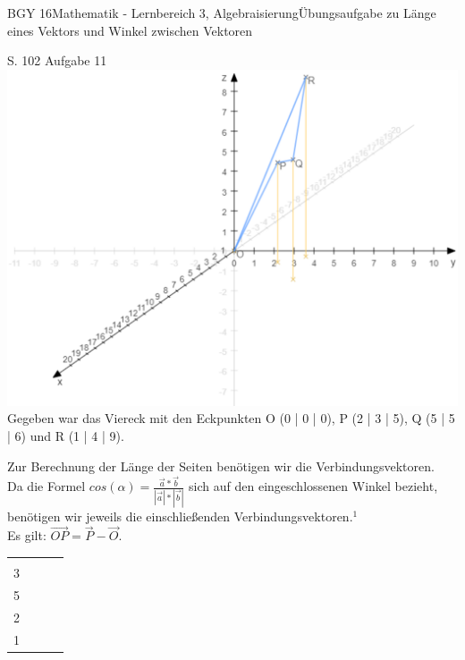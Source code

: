 \documentclass[oneside,openany,headings=optiontotoc,11pt,numbers=noenddot]{scrreprt}
\begin{document}
	\begin{worksheet}{BGY 16}{Mathematik - Lernbereich 3, Algebraisierung}{Übungsaufgabe zu Länge eines Vektors und Winkel zwischen Vektoren}
		
		\begin{framed}
			\noindent
			\tiny{\color{codegray}S. 102 Aufgabe 11}\\
			\normalsize
			\noindent
			\includegraphics[scale=0.7]{Bilder/S102N11.png}\\
			Gegeben war das Viereck mit den Eckpunkten O (0 | 0 | 0), P (2 | 3 | 5), Q (5 | 5 | 6) und R (1 | 4 | 9).\\
			\par\noindent
			Zur Berechnung der Länge der Seiten benötigen wir die Verbindungsvektoren.\\
			Da die Formel \(cos{(\alpha)} = \frac{\vec{a}*\vec{b}}{|\vec{a}|*|\vec{b}|}\) sich auf den eingeschlossenen Winkel bezieht, benötigen wir jeweils die einschließenden Verbindungsvektoren.\(^{1}\)\\
			\tiny{\color{codegray}Es gilt: \(\vec{OP} = \vec{P}-\vec{O}\).}\\
			\normalsize
			\par\noindent
			\begin{tabularx}{\textwidth}{XXXX}
				\(\vec{OP} = \left(\begin{array}{c}2 \\ 3 \\5\end{array}\right)\) &
				\(\vec{PQ} =\left(\begin{array}{c}3\\2\\1\end{array}\right)\) &

\end{tabularx}
\end{framed}
\end{worksheet}
\end{document}
